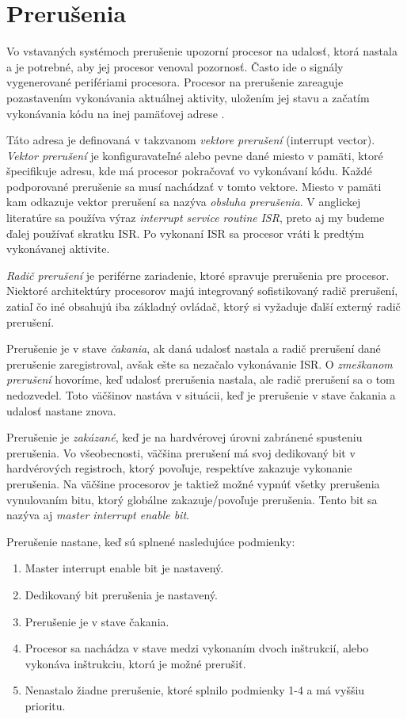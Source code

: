 \section{Prerušenia}
\noindent Vo vstavaných systémoch prerušenie upozorní procesor na udalosť, ktorá nastala a je potrebné, aby jej procesor venoval pozornosť. Často ide o signály vygenerované perifériami procesora. Procesor na prerušenie zareaguje pozastavením vykonávania aktuálnej aktivity, uložením jej stavu a začatím vykonávania kódu na inej pamäťovej adrese \cite{wangAutomaticDetectionValidation2017}. \par 
Táto adresa je definovaná v takzvanom \textit{vektore prerušení} (interrupt vector). \textit{Vektor prerušení} je konfiguravateľné alebo pevne dané miesto v pamäti, ktoré špecifikuje adresu, kde má procesor pokračovať vo vykonávaní kódu. Každé podporované prerušenie sa musí nachádzať v tomto vektore. Miesto v pamäti kam odkazuje vektor prerušení sa nazýva \textit{obsluha prerušenia}. V anglickej literatúre sa používa výraz \textit{interrupt service routine} \textit{ISR}, preto aj my budeme ďalej používať skratku  ISR. Po vykonaní  ISR sa procesor vráti k predtým vykonávanej aktivite. \par
\textit{Radič prerušení} je periférne zariadenie, ktoré spravuje prerušenia pre procesor. Niektoré architektúry procesorov majú integrovaný sofistikovaný radič prerušení, zatiaľ čo iné obsahujú iba základný ovládač, ktorý si vyžaduje ďalší externý radič prerušení. \par
Prerušenie je v stave \textit{čakania}, ak daná udalosť nastala a radič prerušení dané prerušenie zaregistroval, avšak ešte sa nezačalo vykonávanie ISR.  O \textit{zmeškanom prerušení} hovoríme, keď udalosť prerušenia nastala, ale radič prerušení sa o tom nedozvedel. Toto väčšinov nastáva v situácii, keď je prerušenie v stave čakania a udalosť nastane znova. \par
Prerušenie je \textit{zakázané}, keď je na hardvérovej úrovni zabránené spusteniu prerušenia. Vo všeobecnosti, väčšina prerušení má svoj dedikovaný bit v hardvérových registroch, ktorý povoľuje, respektíve zakazuje vykonanie prerušenia. Na väčšine procesorov je taktiež možné vypnúť všetky prerušenia vynulovaním bitu, ktorý globálne zakazuje/povoľuje prerušenia. Tento bit sa nazýva aj \textit{master interrupt enable bit}.\par 
Prerušenie nastane, keď sú splnené nasledujúce podmienky:
\begin{enumerate}
    \item Master interrupt enable bit je nastavený.
    \item Dedikovaný bit prerušenia je nastavený.
    \item Prerušenie je v stave čakania.
    \item Procesor sa nachádza v stave medzi vykonaním dvoch inštrukcií, alebo vykonáva inštrukciu, ktorú je možné prerušiť.
    \item Nenastalo žiadne prerušenie, ktoré splnilo podmienky 1-4 a má vyššiu prioritu.
\end{enumerate} \par

